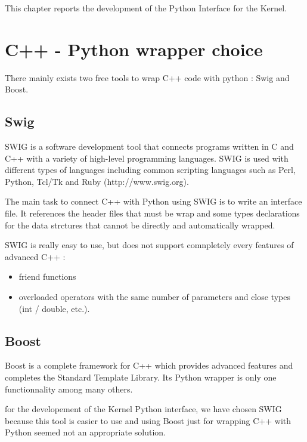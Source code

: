 
This chapter reports the development of the Python Interface for the Kernel.

\section{C++ - Python wrapper choice}

There mainly exists two free tools to wrap C++ code with python : Swig and Boost. \\ 


\subsection{Swig}

SWIG is a software development tool that connects programs written in C and C++ with a variety of high-level programming languages. SWIG is used with different types of languages including common scripting languages such as Perl, Python, Tcl/Tk and Ruby (http://www.swig.org). 

The main task to connect C++ with Python using SWIG is to write an interface file. It references the header files that must be wrap and some types declarations for the data strctures that cannot be directly and automatically wrapped.

SWIG is really easy to use, but does not support comnpletely every features of advanced C++ :
\begin{itemize}
\item friend functions
\item overloaded operators with the same number of parameters and close types (int / double, etc.).
\end{itemize}

\subsection{Boost}

Boost is a complete framework for C++ which provides advanced features and completes the Standard Template Library. Its Python wrapper is only one functionnality among many others.

for the developement of the Kernel Python interface, we have chosen SWIG because this tool is easier to use and using Boost just for wrapping C++ with Python seemed not an appropriate solution.



